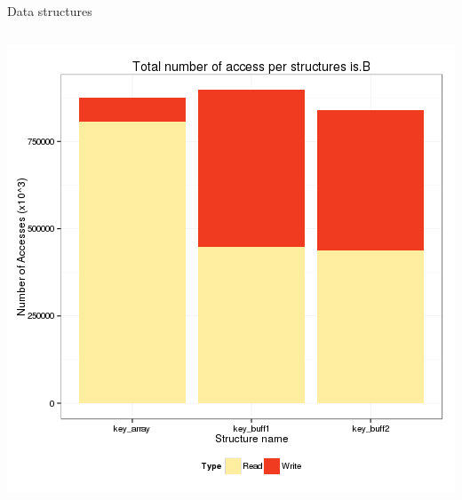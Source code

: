\documentclass[xcolor={usenames,dvipsnames},hyperref={pdfusetitle}]{beamer}
\begin{document}
\begin{frame}{Data structures}
\begin{columns}
\begin{column}{.45\linewidth}
            \includegraphics[width=\linewidth]{tabarnac/is_b_structs_rw.png}
        \end{column}
    \end{columns}
\end{frame}
\end{document}
